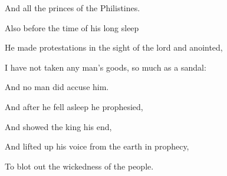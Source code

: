 {\par }{\Q And all the princes of the Philistines.
\par }{\Q {}Also before the time of his
 long sleep
\par }{\Q He made protestations in the sight of the lord and
{} anointed,
\par }{\Q I have not taken any man’s goods, so much as a sandal:
\par }{\Q And no man did accuse him.
\par }{\Q {}And after he fell asleep he prophesied,
\par }{\Q And showed the king his end,
\par }{\Q And lifted up his voice from the earth in prophecy,
\par }{\Q To blot out the wickedness of the people.
\par }{\BB \par }
